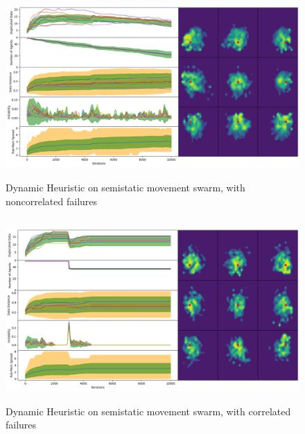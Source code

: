 \documentclass{UoYCSproject}
\begin{document}
\begin{figure}[htb]
\label{fig:static_movement_non2}
\begin{center}
\centering
\includegraphics[height=7cm]{"./Dynamic_Heuristic/Static_Move_non.png"}
\caption{Dynamic Heuristic on semi\-static movement swarm, with non\-correlated failures}
\end{center}
\end{figure}

\begin{figure}[htb]
\label{fig:static_movement_con2}
\begin{center}
\centering
\includegraphics[height=7cm]{"./Dynamic_Heuristic/Static_Move_con.png"}
\caption{Dynamic Heuristic on semi\-static movement swarm, with correlated failures}
\end{center}
\end{figure}
\end{document}
